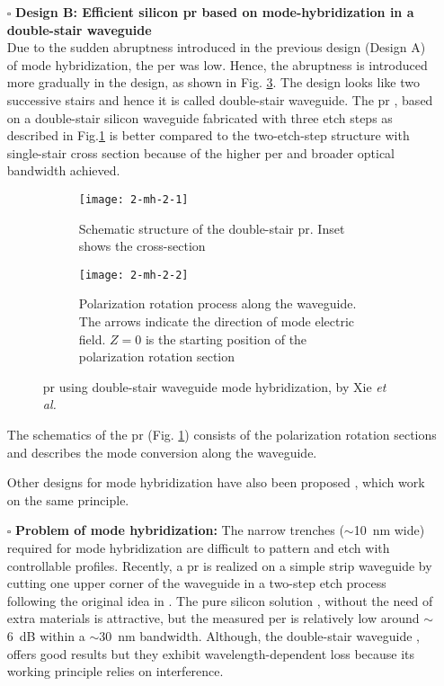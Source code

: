 \documentclass[../report.tex]{subfiles}
\begin{document}
\begin{itemize}[leftmargin=*]
	\item[$\square$] \textbf{Design B: Efficient silicon \gls{pr} based on mode-hybridization in a double-stair waveguide}\\
	Due to the sudden abruptness introduced in the previous design (Design A) of mode hybridization, the \gls{per} was low. Hence, the abruptness is introduced more gradually in the design, as shown in Fig. \ref{fig:2_mh_2_2}. The design looks like two successive stairs and hence it is called double-stair waveguide. The \gls{pr} \cite{xie_efficient_2015}, based on a double-stair silicon waveguide fabricated with three etch steps as described in Fig.\ref{fig:2_mh_2_1} is better compared to the two-etch-step structure with single-stair cross section \cite{aamer_cmos_2012} because of the higher \gls{per} and broader optical bandwidth achieved. 
	\begin{figure}[H] %
		\begin{subfigure}[t]{0.45\textwidth}
			\texttt{[image: 2-mh-2-1]}
			\caption{Schematic structure of the double-stair \gls{pr}. Inset shows the cross-section}
			\label{fig:2_mh_2_1}
		\end{subfigure}
		\hfill
		\begin{subfigure}[t]{0.45\textwidth}
			\texttt{[image: 2-mh-2-2]}
			\caption{Polarization rotation process along the waveguide. The arrows indicate the direction of mode electric field. $Z = 0$ is the starting position of the polarization rotation section}
			\label{fig:2_mh_2_2}
		\end{subfigure}
		\caption{\gls{pr} using double-stair waveguide mode hybridization, by Xie \textit{et al.} \cite{xie_efficient_2015}}
	\end{figure}
	\noindent The schematics of the \gls{pr} (Fig. \ref{fig:2_mh_2_1}) consists of the polarization rotation sections and describes the mode conversion along the waveguide.\par
	
	Other designs for mode hybridization have also been proposed \cite{fukuda_integrated_2008,vermeulen_Silicon_2012}, which work on the same principle.
	
	\item[$\square$] \textbf{Problem of mode hybridization:} The narrow trenches ($\sim$\SI{10}{\nano\meter} wide) required for mode hybridization are difficult to pattern and etch with controllable profiles. Recently, a \gls{pr} \cite{aamer_cmos_2012} is realized on a simple strip waveguide by cutting one upper corner of the waveguide in a two-step etch process following the original idea in \cite{wang_ultrasmall_2008}. The pure silicon solution \cite{aamer_cmos_2012}, without the need of extra materials is attractive, but the measured \gls{per} is relatively low around $\sim$\SI{6}{\deci\bel} within a $\sim$\SI{30}{\nano\meter} bandwidth. Although, the double-stair waveguide \cite{xie_efficient_2015}, offers good results but they exhibit wavelength-dependent loss because its working principle relies on interference.
			
\end{itemize}
		
\end{document}
